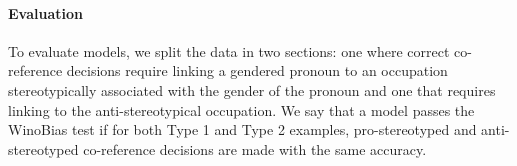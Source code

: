 


\paragraph{Evaluation}
To evaluate models, we split the data in two sections: one where correct co-reference decisions require linking a gendered pronoun to an occupation stereotypically associated with the gender of the pronoun and one that requires linking to the anti-stereotypical occupation.
We say that a model passes the WinoBias test if for both Type 1 and Type 2 examples, pro-stereotyped and anti-stereotyped co-reference decisions are made with the same accuracy.


